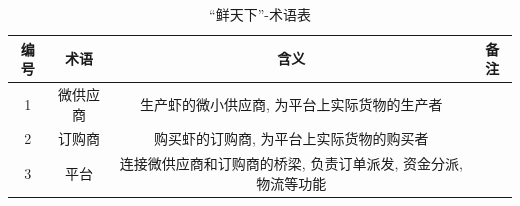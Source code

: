 \begin{table}[h] %
	\centering
        \label{tab:glossary}
        \caption{“鲜天下”-术语表}
		\begin{tabular}{*{4}{c}}
			\toprule
	 		编号 & 术语 & 含义 & 备注\\
            \midrule
            1 & 微供应商 & 生产虾的微小供应商, 为平台上实际货物的生产者 \\
            2 & 订购商 & 购买虾的订购商, 为平台上实际货物的购买者 \\
            3 & 平台 & 连接微供应商和订购商的桥梁, 负责订单派发, 资金分派, 物流等功能\\
			\bottomrule
		\end{tabular}
\end{table}

